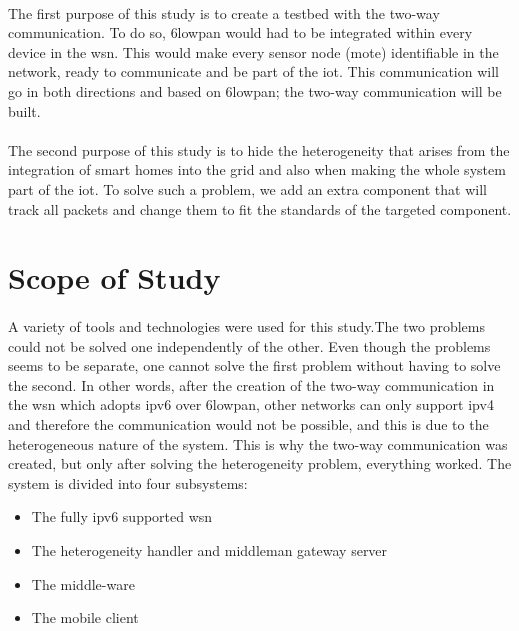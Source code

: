 \documentclass[oneside,12pt,a4paper,final]{book}
\begin{document}
\paragraph{}
The first purpose of this study is to create a testbed with the two-way communication. To do so, \gls{6lowpan} would had to be integrated within every device in the \gls{wsn}. This would make every sensor node (mote) identifiable in the network, ready to communicate and be part of the \gls{iot}. This communication will go in both directions and based on \gls{6lowpan}; the two-way communication will be built.
\paragraph{}
The second purpose of this study is to hide the heterogeneity that arises from the integration of smart homes into the grid and also when making the whole system part of the \gls{iot}. To solve such a problem, we add an extra component that will track all  packets and change them to fit the standards of the targeted component.

\section{Scope of Study}
\paragraph{}
A variety of tools and technologies were used for this study.The two problems could not be solved one independently of the other. Even though the problems seems to be separate, one cannot solve  the first problem without having to solve the second. In other words, after the creation of the two-way communication in the \gls{wsn} which adopts \gls{ipv6} over \gls{6lowpan}, other networks can only support \gls{ipv4} and therefore the communication would not be possible, and this is due to the heterogeneous nature of the system. This is why the two-way communication was created, but only after solving the heterogeneity problem, everything worked.
The system is divided into four subsystems:
\begin{itemize}
\item The fully \gls{ipv6} supported \gls{wsn}
\item The heterogeneity handler and middleman gateway server
\item The middle-ware
\item The mobile client
\end{itemize}
\end{document}
